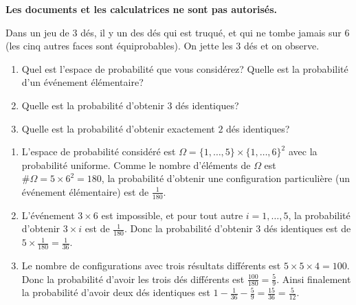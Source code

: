 \documentclass[a4paper,11pt,reqno]{amsart}
\begin{document}
\ifsolutions\else
\textbf{Les documents et les calculatrices ne sont pas autorisés.}

\hfill
\fi

\begin{exo}

  Dans un jeu de $3$ dés, il y un des dés qui est truqué, et qui ne tombe jamais sur $6$ (les cinq autres faces sont équiprobables). On jette les $3$ dés et on observe.
  \begin{enumerate}
    \item Quel est l'espace de probabilité que vous considérez? Quelle est la probabilité d'un événement élémentaire?

    \item Quelle est la probabilité d'obtenir $3$ dés identiques?

    \item Quelle est la probabilité d'obtenir exactement $2$ dés identiques?
  \end{enumerate}
\end{exo}

\begin{solution}
  \begin{enumerate}
    \item L'espace de probabilité considéré est $\Omega = \{1,\ldots,5\} \times \{1,\ldots,6\}^{2}  $ avec la probabilité uniforme. Comme le nombre d'éléments de $\Omega$ est $\#\Omega = 5 \times 6^{2}=180$, la probabilité d'obtenir une configuration particulière (un événement élémentaire) est de $\frac{1}{180}$.

    \item L'événement $3 \times 6$ est impossible, et pour tout autre $i=1,\ldots,5$, la probabilité d'obtenir $3 \times i$ est de $\frac{1}{180}$. Donc la probabilité d'obtenir $3$ dés identiques est de $5\times\frac{1}{180} = \frac{1}{36}$.

    \item Le nombre de configurations avec trois résultats différents est $5 \times 5 \times 4 = 100$. Donc la probabilité d'avoir les trois dés différents est $\frac{100}{180}=\frac{5}{9}$. Ainsi finalement la probabilité d'avoir deux dés identiques est $1-\frac{1}{36}-\frac{5}{9} = \frac{15}{36} = \frac{5}{12}$.
  \end{enumerate}
\end{solution}
\end{document}
